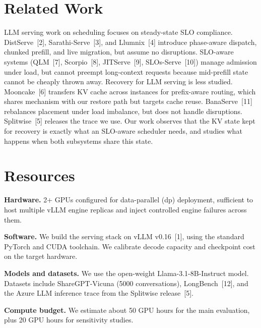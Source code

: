 \documentclass[11pt]{article}
\begin{document}
\section*{Related Work}
LLM serving work on scheduling focuses on steady-state SLO compliance. DistServe~[2], Sarathi-Serve~[3], and Llumnix~[4] introduce phase-aware dispatch, chunked prefill, and live migration, but assume no disruptions. SLO-aware systems (QLM~[7], Scorpio~[8], JITServe~[9], SLOs-Serve~[10]) manage admission under load, but cannot preempt long-context requests because mid-prefill state cannot be cheaply thrown away. Recovery for LLM serving is less studied. Mooncake~[6] transfers KV cache across instances for prefix-aware routing, which shares mechanism with our restore path but targets cache reuse. BanaServe~[11] rebalances placement under load imbalance, but does not handle disruptions. Splitwise~[5] releases the trace we use. Our work observes that the KV state kept for recovery is exactly what an SLO-aware scheduler needs, and studies what happens when both subsystems share this state.
 
\section*{Resources}
\textbf{Hardware.} 2+ GPUs configured for data-parallel (dp) deployment, sufficient to host multiple vLLM engine replicas and inject controlled engine failures across them.
 
\textbf{Software.} We build the serving stack on vLLM v0.16~[1], using the standard PyTorch and CUDA toolchain. We calibrate decode capacity and checkpoint cost on the target hardware.
 
\textbf{Models and datasets.} We use the open-weight Llama-3.1-8B-Instruct model. Datasets include ShareGPT-Vicuna (5000 conversations), LongBench~[12], and the Azure LLM inference trace from the Splitwise release~[5].
 
\textbf{Compute budget.} We estimate about 50 GPU hours for the main evaluation, plus 20 GPU hours for sensitivity studies.
 
\end{document}
